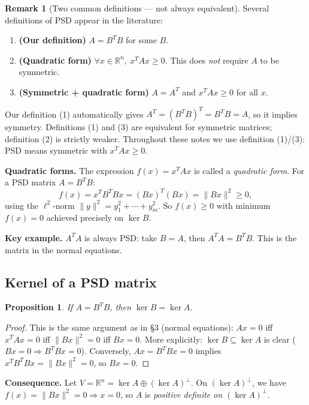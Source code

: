 \documentclass[11pt]{article}
\theoremstyle{definition}
\newtheorem{remark}{Remark}[section]
\theoremstyle{plain}
\newtheorem{proposition}{Proposition}[section]
\begin{document}
\begin{remark}[Two common definitions --- not always equivalent]
  Several definitions of PSD appear in the literature:
  \begin{enumerate}
    \item \textbf{(Our definition)} $A = B^T B$ for some $B$.
    \item \textbf{(Quadratic form)} $\forall x\in\mathbb{R}^n,\ x^TAx\ge 0$.
      This does \emph{not} require $A$ to be symmetric.
    \item \textbf{(Symmetric + quadratic form)} $A = A^T$ and $x^TAx\ge 0$
      for all $x$.
  \end{enumerate}
  Our definition (1) automatically gives $A^T = (B^TB)^T = B^TB = A$, so it
  implies symmetry.  Definitions (1) and (3) are equivalent for symmetric
  matrices; definition (2) is strictly weaker.  Throughout these notes we use
  definition (1)/(3): PSD means symmetric with $x^TAx\ge 0$.
\end{remark}

\noindent
\textbf{Quadratic forms.}  The expression $f(x) = x^TAx$ is called a
\emph{quadratic form}.  For a PSD matrix $A = B^TB$:
\[
  f(x) = x^T B^T B x = (Bx)^T(Bx) = \|Bx\|^2 \ge 0,
\]
using the $\ell^2$-norm $\|y\|^2 = y_1^2 + \cdots + y_m^2$.
So $f(x) \ge 0$ with minimum $f(x) = 0$ achieved precisely on $\ker B$.

\medskip\noindent
\textbf{Key example.} $A^TA$ is always PSD: take $B = A$, then
$A^TA = B^TB$.  This is the matrix in the normal equations.

\subsection{Kernel of a PSD matrix}

\begin{proposition}
  If $A = B^TB$, then $\ker B = \ker A$.
\end{proposition}
\begin{proof}
  This is the same argument as in \S3 (normal equations): $Ax = 0$ iff
  $x^TAx = 0$ iff $\|Bx\|^2 = 0$ iff $Bx = 0$.
  More explicitly: $\ker B \subseteq \ker A$ is clear ($Bx=0\Rightarrow
  B^TBx=0$).  Conversely, $Ax = B^TBx = 0$ implies $x^TB^TBx = \|Bx\|^2 = 0$,
  so $Bx = 0$.
\end{proof}

\noindent
\textbf{Consequence.} Let $V = \mathbb{R}^n = \ker A \oplus (\ker A)^\perp$.
On $(\ker A)^\perp$, we have $f(x) = \|Bx\|^2 = 0 \Rightarrow x = 0$, so
$A$ is \emph{positive definite on $(\ker A)^\perp$}.
\end{document}
